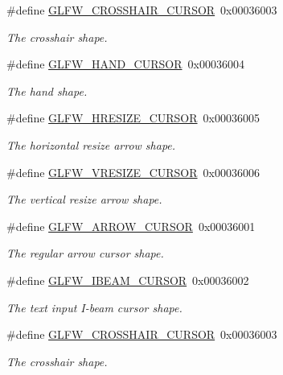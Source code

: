 \begin{DoxyCompactItemize}
\#define \hyperlink{group__shapes_ga8af88c0ea05ab9e8f9ac1530e8873c22}{G\+L\+F\+W\+\_\+\+C\+R\+O\+S\+S\+H\+A\+I\+R\+\_\+\+C\+U\+R\+S\+OR}~0x00036003
\begin{DoxyCompactList}\small\item\em The crosshair shape. \end{DoxyCompactList}\item 
\#define \hyperlink{group__shapes_ga1db35e20849e0837c82e3dc1fd797263}{G\+L\+F\+W\+\_\+\+H\+A\+N\+D\+\_\+\+C\+U\+R\+S\+OR}~0x00036004
\begin{DoxyCompactList}\small\item\em The hand shape. \end{DoxyCompactList}\item 
\#define \hyperlink{group__shapes_gabb3eb0109f11bb808fc34659177ca962}{G\+L\+F\+W\+\_\+\+H\+R\+E\+S\+I\+Z\+E\+\_\+\+C\+U\+R\+S\+OR}~0x00036005
\begin{DoxyCompactList}\small\item\em The horizontal resize arrow shape. \end{DoxyCompactList}\item 
\#define \hyperlink{group__shapes_gaf024f0e1ff8366fb2b5c260509a1fce5}{G\+L\+F\+W\+\_\+\+V\+R\+E\+S\+I\+Z\+E\+\_\+\+C\+U\+R\+S\+OR}~0x00036006
\begin{DoxyCompactList}\small\item\em The vertical resize arrow shape. \end{DoxyCompactList}\item 
\#define \hyperlink{group__shapes_ga8ab0e717245b85506cb0eaefdea39d0a}{G\+L\+F\+W\+\_\+\+A\+R\+R\+O\+W\+\_\+\+C\+U\+R\+S\+OR}~0x00036001
\begin{DoxyCompactList}\small\item\em The regular arrow cursor shape. \end{DoxyCompactList}\item 
\#define \hyperlink{group__shapes_ga36185f4375eaada1b04e431244774c86}{G\+L\+F\+W\+\_\+\+I\+B\+E\+A\+M\+\_\+\+C\+U\+R\+S\+OR}~0x00036002
\begin{DoxyCompactList}\small\item\em The text input I-\/beam cursor shape. \end{DoxyCompactList}\item 
\#define \hyperlink{group__shapes_ga8af88c0ea05ab9e8f9ac1530e8873c22}{G\+L\+F\+W\+\_\+\+C\+R\+O\+S\+S\+H\+A\+I\+R\+\_\+\+C\+U\+R\+S\+OR}~0x00036003
\begin{DoxyCompactList}\small\item\em The crosshair shape. \end{DoxyCompactList}\item 

\end{DoxyCompactItemize}

